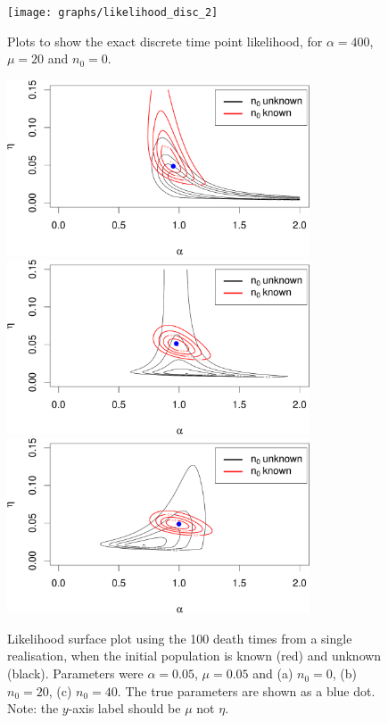 \documentclass[11pt,BCOR2mm,DIV14]{scrartcl}
\begin{document}
\begin{figure}[h]
\centering
\texttt{[image: graphs/likelihood\_disc\_2]}
\caption{Plots to show the exact discrete time point likelihood, for $\alpha =400$, $\mu=20$ and $n_0=0$.}\label{F1}
\end{figure}
\clearpage
\newpage
\begin{figure}[t]
\centering
\includegraphics[width=0.8\textwidth]{graphs/n0_0-crop}
\includegraphics[width=0.8\textwidth]{graphs/n0_20-crop}
\includegraphics[width=0.8\textwidth]{graphs/n0_40-crop}
\caption{Likelihood surface plot using the 100 death times from a single realisation, when the initial population is known (red) and unknown (black). Parameters were $\alpha = 0.05$, $\mu=0.05$ and (a) $n_0=0$, (b) $n_0 = 20$, (c) $n_0 = 40$. The true parameters are shown as a blue dot.
Note: the $y$-axis label should be $\mu$ not $\eta$.}\label{F2}
\end{figure}
\end{document}
